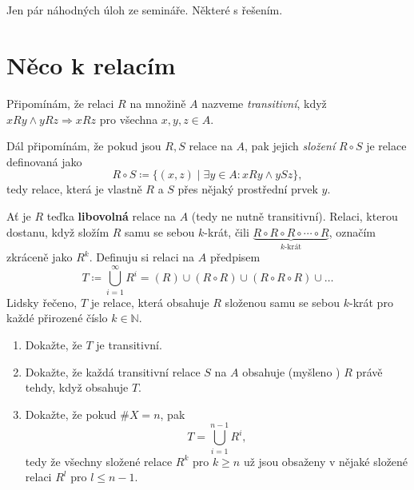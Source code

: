 \documentclass[a4paper,11pt]{article}
\title{\Huge\textsf{}\\
 \Large\textsf{}
 \author{}
 \date{}
}
\newcommand{\N}{\mathbb{N}}
\begin{document}
Jen pár náhodných úloh ze semináře. Některé s řešením.

\section*{Něco k relacím}

Připomínám, že relaci $R$ na množině $A$ nazveme \emph{transitivní}, když $xRy
\wedge yRz \Rightarrow xRz$ pro všechna $x,y,z \in A$.

Dál připomínám, že pokud jsou $R,S$ relace na $A$, pak jejich \emph{složení}
$R \circ S$ je relace definovaná jako
\[
 R \circ S \coloneqq \{(x,z) \mid  \exists y \in A: xRy \wedge ySz\},
\]
tedy relace, která je vlastně  $R$ a $S$ přes nějaký prostřední
prvek $y$.

Ať je $R$ teďka \textbf{libovolná} relace na $A$ (tedy ne nutně transitivní).
Relaci, kterou dostanu, když složím $R$ samu se sebou $k$-krát, čili
$\underbrace{R \circ R \circ R \circ \cdots \circ R}_{\text{$k$-krát}}$, označím
zkráceně jako $R^{k}$. Definuju si relaci na $A$ předpisem
\[
 T \coloneqq \bigcup_{i=1}^{\infty} R^{i} = (R) \cup (R \circ R) \cup (R \circ R
 \circ R) \cup \ldots
\]
Lidsky řečeno, $T$ je relace, která obsahuje $R$ složenou samu se sebou $k$-krát
pro každé přirozené číslo $k \in \N$.
\begin{enumerate}
 \item Dokažte, že $T$ je transitivní.
 \item Dokažte, že každá transitivní relace $S$ na $A$ obsahuje (myšleno ) $R$ právě tehdy, když obsahuje $T$.
 \item Dokažte, že pokud $\# X = n$, pak
  \[
   T = \bigcup_{i=1}^{n-1} R^{i},
  \]
  tedy že všechny složené relace $R^{k}$ pro $k \geq n$ už jsou obsaženy v
  nějaké složené relaci $R^{l}$ pro $l \leq n-1$.
\end{enumerate}
\end{document}
